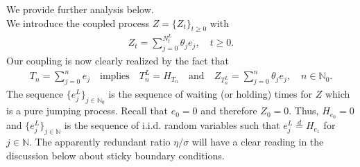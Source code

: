 \documentclass[10pt,a4paper]{article}
\numberwithin{equation}{section}
\theoremstyle{plain}
\theoremstyle{remark}
\begin{document}
We provide further analysis below.\\

We introduce the coupled process $Z=\{Z_t\}_{t \geq 0}$ with
\begin{align*}
Z_t = \sum_{j=0}^{N^L_t} \theta_j e_j, \quad t\geq 0. 
\end{align*}
Our coupling is now clearly realized by the fact that
\begin{align*}
T_n = \sum_{j=0}^n e_j \quad \textrm{implies} \quad T^L_n = H_{T_n} \quad \textrm{and} \quad Z_{T^L_n} = \sum_{j=0}^n \theta_j e_j, \quad n \in \mathbb{N}_0.
\end{align*}
The sequence $\{e^L_j\}_{j \in \mathbb{N}_0}$ is the sequence of waiting (or holding) times for $Z$ which is a pure jumping process. Recall that $e_0=0$ and therefore  $Z_0=0$. Thus, $H_{e_0}=0$ and $\{e^L_j\}_{j \in \mathbb{N}}$ is the sequence of i.i.d. random variables such that $e^L_j \stackrel{d}{=} H_{e_1}$ for $j \in \mathbb{N}$. The apparently redundant ratio $\eta/\sigma$ will have a clear reading in the discussion below about sticky boundary conditions.\\
\end{document}
